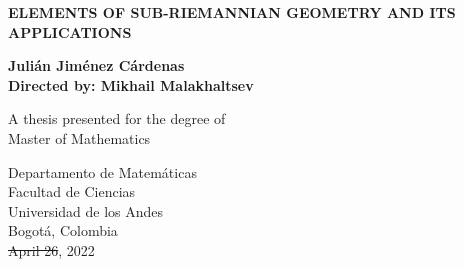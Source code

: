 \documentclass[12pt, letterpaper, reqno]{amsart}
\author{}
\title{}
\let\oldtableofcontents\tableofcontents
\renewcommand{\tableofcontents}{%
  \vspace*{-\linespacing}%
  \oldtableofcontents}
\theoremstyle{definition}
\theoremstyle{plain}
\theoremstyle{remark}
\providecommand{\DIFadd}[1]{{\protect\color{blue}\uwave{#1}}} %
\providecommand{\DIFdel}[1]{{\protect\color{red}\sout{#1}}}                      %
\providecommand{\DIFaddbegin}{} %
\providecommand{\DIFaddend}{} %
\providecommand{\DIFdelbegin}{} %
\providecommand{\DIFdelend}{} %
\newcommand{\DIFscaledelfig}{0.5}
\newlength{\DIFdelgraphicswidth} %
\newlength{\DIFdelgraphicsheight} %
\newcommand{\DIFaddincludegraphics}[2][]{{\color{blue}\fbox{\DIFOincludegraphics[#1]{#2}}}} %
\newcommand{\DIFdelincludegraphics}[2][]{%
\sbox{\DIFdelgraphicsbox}{\DIFOincludegraphics[#1]{#2}}%
\settoboxwidth{\DIFdelgraphicswidth}{\DIFdelgraphicsbox} %
\settoboxtotalheight{\DIFdelgraphicsheight}{\DIFdelgraphicsbox} %
\scalebox{\DIFscaledelfig}{%
\parbox[b]{\DIFdelgraphicswidth}{\usebox{\DIFdelgraphicsbox}\\[-\baselineskip] \rule{\DIFdelgraphicswidth}{0em}}\llap{\resizebox{\DIFdelgraphicswidth}{\DIFdelgraphicsheight}{%
\setlength{\unitlength}{\DIFdelgraphicswidth}%
\begin{picture}(1,1)%
\thicklines\linethickness{2pt} %
{\color[rgb]{1,0,0}\put(0,0){\framebox(1,1){}}}%
{\color[rgb]{1,0,0}\put(0,0){\line( 1,1){1}}}%
{\color[rgb]{1,0,0}\put(0,1){\line(1,-1){1}}}%
\end{picture}%
}\hspace*{3pt}}} %
} %
\DeclareRobustCommand{\DIFaddbegin}{\DIFOaddbegin \let\includegraphics\DIFaddincludegraphics} %
\DeclareRobustCommand{\DIFaddend}{\DIFOaddend \let\includegraphics\DIFOincludegraphics} %
\DeclareRobustCommand{\DIFdelbegin}{\DIFOdelbegin \let\includegraphics\DIFdelincludegraphics} %
\DeclareRobustCommand{\DIFdelend}{\DIFOaddend \let\includegraphics\DIFOincludegraphics} %
\begin{document}
\begin{titlepage}
    \begin{center}
        \vspace*{1cm}

        \Huge
	\textbf{ELEMENTS OF SUB-RIEMANNIAN GEOMETRY AND ITS APPLICATIONS}
        \vspace{0.5cm}
        \LARGE

        \vspace{1.5cm}

        \textbf{Julián Jiménez Cárdenas}\\
        \textbf{Directed by: Mikhail Malakhaltsev}

        \vfill

        A thesis presented for the degree of\\
        Master of Mathematics

        \vspace{0.8cm}

            
        \Large
        Departamento de Matemáticas\\
        Facultad de Ciencias \\
        Universidad de los Andes\\
        Bogotá, Colombia\\
        \DIFdelbegin \DIFdel{April 26}\DIFdelend \DIFaddbegin \DIFadd{July 16}\DIFaddend , 2022

    \end{center}
\end{titlepage}
\maketitle
\newpage
\tableofcontents
\newpage
\end{document}
